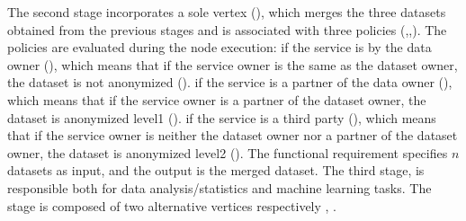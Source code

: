 The second stage incorporates a sole vertex (), which merges the three datasets obtained from the previous stages and is associated with three policies (,,).
The policies are evaluated during the node execution:
if the service is  by the data owner (\pone), which means that if the service owner is the same as the dataset owner, the dataset is not anonymized ().
if the service is a partner of the data owner (\ptwo), which means that if the service owner is a partner of the dataset owner, the dataset is anonymized level1 ().
if the service is a third party (\pthree), which means that if the service owner is neither the dataset owner nor a partner of the dataset owner, the dataset is anonymized level2 ().
The functional requirement specifies $n$ datasets as input, and the output is the merged dataset.
The third stage, is responsible both for data analysis/statistics and machine learning tasks.
The stage is composed of two alternative vertices respectively , .

